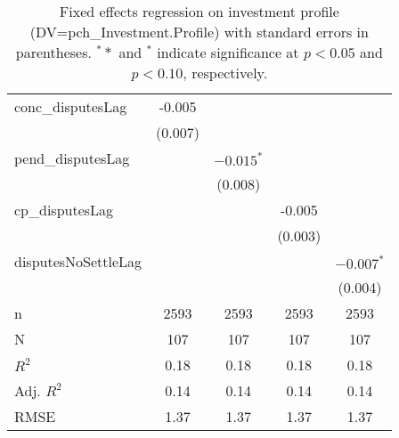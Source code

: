 \begin{table}[ht]
\begin{tabular}{lcccc}
  conc\_disputesLag & -0.005 &  &  &  \\ 
   & (0.007) &  &  &  \\ 
  pend\_disputesLag &  & $-0.015^{\ast}$ &  &  \\ 
   &  & (0.008) &  &  \\ 
  cp\_disputesLag &  &  & -0.005 &  \\ 
   &  &  & (0.003) &  \\ 
  disputesNoSettleLag &  &  &  & $-0.007^{\ast}$ \\ 
   &  &  &  & (0.004) \\ 
   \hline
n & 2593 & 2593 & 2593 & 2593 \\ 
  N & 107 & 107 & 107 & 107 \\ 
  $R^{2}$ & 0.18 & 0.18 & 0.18 & 0.18 \\ 
  Adj. $R^{2}$ & 0.14 & 0.14 & 0.14 & 0.14 \\ 
  RMSE & 1.37 & 1.37 & 1.37 & 1.37 \\ 
   \hline
\hline
\end{tabular}
\caption{Fixed effects regression on investment profile (DV=pch\_Investment.Profile) with standard errors in parentheses. $^**$ and $^*$ indicate significance at $p< 0.05 $ and $p< 0.10 $, respectively.} 
\end{table}

